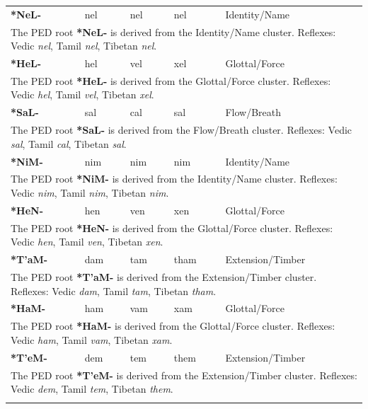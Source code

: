 \begin{longtable}{p{} p{} p{} p{} p{}}
\textbf{*NeL-} & nel & nel & nel & Identity/Name \\ 
\multicolumn{5}{p{\textwidth}}{\small The PED root \textbf{*NeL-} is derived from the Identity/Name cluster. Reflexes: Vedic \textit{nel}, Tamil \textit{nel}, Tibetan \textit{nel}. } \\ \addlinespace 
\textbf{*HeL-} & hel & vel & xel & Glottal/Force \\ 
\multicolumn{5}{p{\textwidth}}{\small The PED root \textbf{*HeL-} is derived from the Glottal/Force cluster. Reflexes: Vedic \textit{hel}, Tamil \textit{vel}, Tibetan \textit{xel}. } \\ \addlinespace 
\textbf{*SaL-} & sal & cal & sal & Flow/Breath \\ 
\multicolumn{5}{p{\textwidth}}{\small The PED root \textbf{*SaL-} is derived from the Flow/Breath cluster. Reflexes: Vedic \textit{sal}, Tamil \textit{cal}, Tibetan \textit{sal}. } \\ \addlinespace 
\textbf{*NiM-} & nim & nim & nim & Identity/Name \\ 
\multicolumn{5}{p{\textwidth}}{\small The PED root \textbf{*NiM-} is derived from the Identity/Name cluster. Reflexes: Vedic \textit{nim}, Tamil \textit{nim}, Tibetan \textit{nim}. } \\ \addlinespace 
\textbf{*HeN-} & hen & ven & xen & Glottal/Force \\ 
\multicolumn{5}{p{\textwidth}}{\small The PED root \textbf{*HeN-} is derived from the Glottal/Force cluster. Reflexes: Vedic \textit{hen}, Tamil \textit{ven}, Tibetan \textit{xen}. } \\ \addlinespace 
\textbf{*T'aM-} & dam & tam & tham & Extension/Timber \\ 
\multicolumn{5}{p{\textwidth}}{\small The PED root \textbf{*T'aM-} is derived from the Extension/Timber cluster. Reflexes: Vedic \textit{dam}, Tamil \textit{tam}, Tibetan \textit{tham}. } \\ \addlinespace 
\textbf{*HaM-} & ham & vam & xam & Glottal/Force \\ 
\multicolumn{5}{p{\textwidth}}{\small The PED root \textbf{*HaM-} is derived from the Glottal/Force cluster. Reflexes: Vedic \textit{ham}, Tamil \textit{vam}, Tibetan \textit{xam}. } \\ \addlinespace 
\textbf{*T'eM-} & dem & tem & them & Extension/Timber \\ 
\multicolumn{5}{p{\textwidth}}{\small The PED root \textbf{*T'eM-} is derived from the Extension/Timber cluster. Reflexes: Vedic \textit{dem}, Tamil \textit{tem}, Tibetan \textit{them}. } \\ \addlinespace 

\end{longtable}
